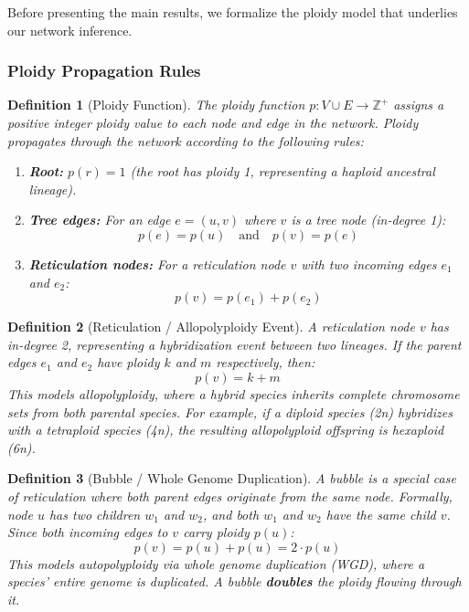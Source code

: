 \documentclass{article}
\newtheorem{definition}{\color{bluem}Definition}
\begin{document}
Before presenting the main results, we formalize the ploidy model that underlies our network inference.

\subsubsection{Ploidy Propagation Rules}

\begin{definition}[Ploidy Function]
The \textit{ploidy function} $p: V \cup E \rightarrow \mathbb{Z}^+$ assigns a positive integer ploidy value to each node and edge in the network. Ploidy propagates through the network according to the following rules:
\begin{enumerate}
    \item \textbf{Root:} $p(r) = 1$ (the root has ploidy 1, representing a haploid ancestral lineage).
    \item \textbf{Tree edges:} For an edge $e = (u, v)$ where $v$ is a tree node (in-degree 1): 
    \[p(e) = p(u) \quad \text{and} \quad p(v) = p(e)\]
    \item \textbf{Reticulation nodes:} For a reticulation node $v$ with two incoming edges $e_1$ and $e_2$:
    \[p(v) = p(e_1) + p(e_2)\]
\end{enumerate}
\end{definition}

\begin{definition}[Reticulation / Allopolyploidy Event]
A \textit{reticulation node} $v$ has in-degree 2, representing a hybridization event between two lineages. If the parent edges $e_1$ and $e_2$ have ploidy $k$ and $m$ respectively, then:
\[p(v) = k + m\]
This models \textit{allopolyploidy}, where a hybrid species inherits complete chromosome sets from both parental species. For example, if a diploid species (2n) hybridizes with a tetraploid species (4n), the resulting allopolyploid offspring is hexaploid (6n).
\end{definition}

\begin{definition}[Bubble / Whole Genome Duplication]
A \textit{bubble} is a special case of reticulation where both parent edges originate from the same node. Formally, node $u$ has two children $w_1$ and $w_2$, and both $w_1$ and $w_2$ have the same child $v$. Since both incoming edges to $v$ carry ploidy $p(u)$:
\[p(v) = p(u) + p(u) = 2 \cdot p(u)\]
This models \textit{autopolyploidy} via whole genome duplication (WGD), where a species' entire genome is duplicated. A bubble \textbf{doubles} the ploidy flowing through it.
\end{definition}
\end{document}
